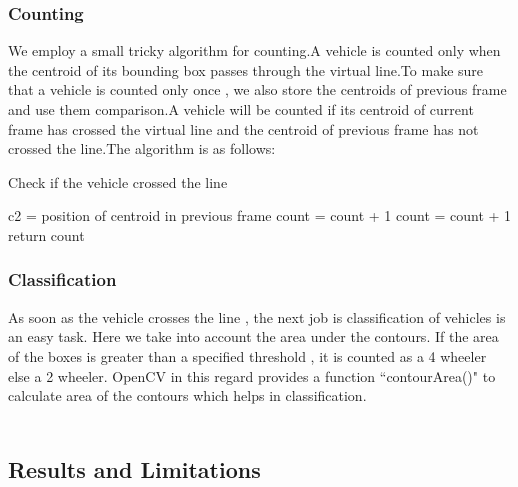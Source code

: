 \documentclass[12pt, a4paper]{article}
\begin{document}
\begin{large}\subsubsection{Counting}\end{large}
\hspace{3cm}
We employ a small tricky algorithm for counting.A vehicle is counted only when the centroid of its bounding box passes through the virtual line.To make sure that a vehicle is counted only once , we also store the centroids of previous frame and use them comparison.A vehicle will be counted if its centroid of current frame has crossed the virtual line and the centroid of previous frame has not crossed the line.The algorithm is as follows: 
\\
\begin{algorithm}[H]
\caption{Check if the vehicle crossed the line}
\label{algo}
\begin{algorithmic}[1]
\State c2 = position of centroid in previous frame
\State count = count + 1
\EndIf
{}
\State count = count + 1
\EndIf
\EndFor
\\return count
\EndProcedure
\end{algorithmic}
\end{algorithm}
\begin{large}\subsubsection{Classification}\end{large}
\hspace{3cm}
As soon as the vehicle crosses the line , the next job is classification of vehicles is an easy task. Here we take into account the area under the contours. If the area of the boxes is greater than a specified threshold , it is counted as a 4 wheeler else a 2 wheeler. OpenCV in this regard provides a function ``contourArea()" to calculate area of the contours which helps in classification.
\\
\\
\begin{large}\subsection{Results and Limitations}\end{large}
\end{document}
